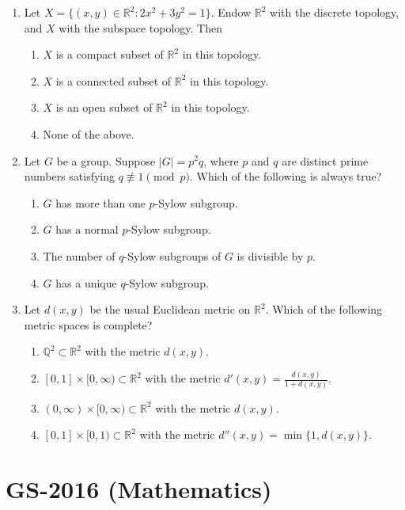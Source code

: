 \documentclass[11pt, a4paper]{article}
\begin{document}
\begin{enumerate}[resume]
  \item Let $X = \{(x, y) \in \mathbb{R}^2 : 2x^2 + 3y^2 = 1\}$. Endow $\mathbb{R}^2$ with the discrete topology, and $X$ with the subspace topology. Then
  \begin{enumerate}[label=\Alph*.]
    \item $X$ is a compact subset of $\mathbb{R}^2$ in this topology.
    \item $X$ is a connected subset of $\mathbb{R}^2$ in this topology.
    \item $X$ is an open subset of $\mathbb{R}^2$ in this topology.
    \item None of the above.
  \end{enumerate}

  \item Let $G$ be a group. Suppose $|G| = p^2 q$, where $p$ and $q$ are distinct prime numbers satisfying $q \not\equiv 1 \pmod p$. Which of the following is always true?
  \begin{enumerate}[label=\Alph*.]
    \item $G$ has more than one $p$-Sylow subgroup.
    \item $G$ has a normal $p$-Sylow subgroup.
    \item The number of $q$-Sylow subgroups of $G$ is divisible by $p$.
    \item $G$ has a unique $q$-Sylow subgroup.
  \end{enumerate}

  \item Let $d(x, y)$ be the usual Euclidean metric on $\mathbb{R}^2$. Which of the following metric spaces is complete?
  \begin{enumerate}[label=\Alph*.]
    \item $\mathbb{Q}^2 \subset \mathbb{R}^2$ with the metric $d(x, y)$.
    \item $[0, 1] \times [0, \infty) \subset \mathbb{R}^2$ with the metric $d'(x, y) = \frac{d(x, y)}{1 + d(x, y)}$.
    \item $(0, \infty) \times [0, \infty) \subset \mathbb{R}^2$ with the metric $d(x, y)$.
    \item $[0, 1] \times [0, 1) \subset \mathbb{R}^2$ with the metric $d''(x, y) = \min\{1, d(x, y)\}$.
  \end{enumerate}
\end{enumerate}

\newpage

\section{GS-2016 (Mathematics)}
\end{document}
